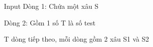 Input  
Dòng 1: Chứa một xâu S  

   Dòng 2: Gồm 1 số T là số test  

   T dòng tiếp theo, mỗi dòng gồm 2 xâu S1 và S2